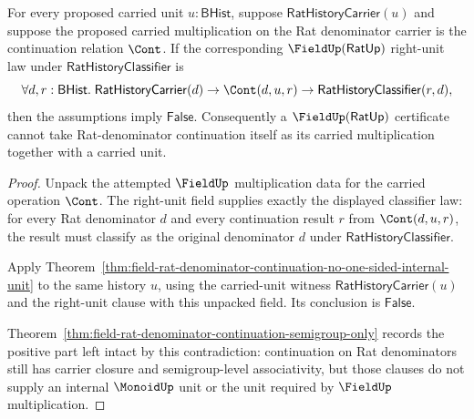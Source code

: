 \begin{theorem}
\label{thm:field-rat-denominator-continuation-not-field-multiplication}
For every proposed carried unit $u:\mathsf{BHist}$, suppose
$\mathsf{RatHistoryCarrier}(u)$ and suppose the proposed carried
multiplication on the Rat denominator carrier is the continuation relation
$\Cont$. If the corresponding $\FieldUp(\mathsf{RatUp})$ right-unit law under
$\mathsf{RatHistoryClassifier}$ is
$$
\forall d,r:\mathsf{BHist}.\;
\mathsf{RatHistoryCarrier}(d)\to
\Cont(d,u,r)\to
\mathsf{RatHistoryClassifier}(r,d),
$$
then the assumptions imply $\mathsf{False}$. Consequently a
$\FieldUp(\mathsf{RatUp})$ certificate cannot take Rat-denominator
continuation itself as its carried multiplication together with a carried
unit.
\end{theorem}
\begin{proof}
Unpack the attempted $\FieldUp$ multiplication data for the carried operation
$\Cont$. The right-unit field supplies exactly the displayed classifier law:
for every Rat denominator $d$ and every continuation result $r$ from
$\Cont(d,u,r)$, the result must classify as the original denominator $d$ under
$\mathsf{RatHistoryClassifier}$.

Apply
Theorem~\ref{thm:field-rat-denominator-continuation-no-one-sided-internal-unit}
to the same history $u$, using the carried-unit witness
$\mathsf{RatHistoryCarrier}(u)$ and the right-unit clause with this unpacked
field. Its conclusion is $\mathsf{False}$.

Theorem~\ref{thm:field-rat-denominator-continuation-semigroup-only} records the
positive part left intact by this contradiction: continuation on Rat
denominators still has carrier closure and semigroup-level associativity, but
those clauses do not supply an internal $\MonoidUp$ unit or the unit required by
$\FieldUp$ multiplication.
\end{proof}

